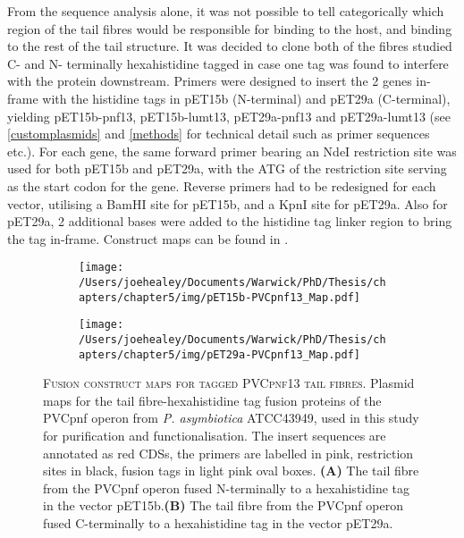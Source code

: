 From the sequence analysis alone, it was not possible to tell categorically which region of the tail fibres would be responsible for binding to the host, and binding to the rest of the tail structure. It was decided to clone both of the fibres studied C- and N- terminally hexahistidine tagged in case one tag was found to interfere with the protein downstream. Primers were designed to insert the 2 genes in-frame with the histidine tags in pET15b (N-terminal) and pET29a (C-terminal), yielding pET15b-pnf13, pET15b-lumt13, pET29a-pnf13 and pET29a-lumt13 (see \vref{customplasmids} and \vref{methods} for technical detail such as primer sequences etc.). For each gene, the same forward primer bearing an NdeI restriction site was used for both pET15b and pET29a, with the ATG of the restriction site serving as the start codon for the gene. Reverse primers had to be redesigned for each vector, utilising a BamHI site for pET15b, and a KpnI site for pET29a. Also for pET29a, 2 additional bases were added to the histidine tag linker region to bring the tag in-frame. Construct maps can be found in .


\begin{figure}[p]
\centering
    \begin{subfigure}{\textwidth}
        \centering
        \texttt{[image: /Users/joehealey/Documents/Warwick/PhD/Thesis/chapters/chapter5/img/pET15b-PVCpnf13\_Map.pdf]}
        \captionsetup{singlelinecheck=off, justification=centering, font=footnotesize, aboveskip=10pt}
        \caption{}
        \label{pET15pnf}
    \end{subfigure}%
    
    \vspace{0.5cm}
    
    \begin{subfigure}{\textwidth}
        \centering
            \texttt{[image: /Users/joehealey/Documents/Warwick/PhD/Thesis/chapters/chapter5/img/pET29a-PVCpnf13\_Map.pdf]}
            \captionsetup{singlelinecheck=off, justification=centering, font=footnotesize, aboveskip=10pt}
            \caption{}
            \label{pET29pnf}
        \end{subfigure}%
	\captionsetup{singlelinecheck=off, justification=justified, font=footnotesize, aboveskip=10pt}
	\caption[Plasmid maps for cloned PVCpnf tail fibre proteins]{\textsc{\normalsize Fusion construct maps for tagged PVCpnf13 tail fibres.}\vspace{0.1cm} \newline Plasmid maps for the tail fibre-hexahistidine tag fusion proteins of the PVCpnf operon from \emph{P. asymbiotica} ATCC43949, used in this study for purification and functionalisation. The insert sequences are annotated as red CDSs, the primers are labelled in pink, restriction sites in black, fusion tags in light pink oval boxes. \textbf{(A)} The tail fibre from the PVCpnf operon fused N-terminally to a hexahistidine tag in the vector pET15b.\textbf{(B)} The tail fibre from the PVCpnf operon fused C-terminally to a hexahistidine tag in the vector pET29a.}
	\label{tailfibreplasmidspnf}
\end{figure}


